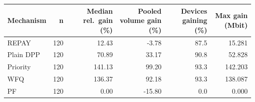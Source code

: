 \begin{tabular}{lrrrrr}
\toprule
Mechanism & n & Median rel.\ gain (\%) & Pooled volume gain (\%) & Devices gaining (\%) & Max gain (Mbit) \\
\midrule
REPAY & 120 & 12.43 & -3.78 & 87.5 & 15.281 \\
Plain DPP & 120 & 70.89 & 33.17 & 90.8 & 52.828 \\
Priority & 120 & 141.13 & 99.20 & 93.3 & 142.203 \\
WFQ & 120 & 136.37 & 92.18 & 93.3 & 138.087 \\
PF & 120 & 0.00 & -15.80 & 0.0 & 0.000 \\
\bottomrule
\end{tabular}
